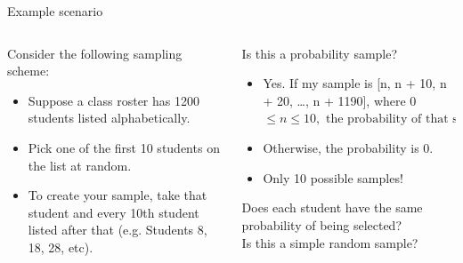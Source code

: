 \documentclass[aspectratio=169]{../latex_main/tntbeamer}  %
\begin{document}
		\begin{frame}{Example scenario}
	    \begin{columns}
	        \begin{column}{.3\textwidth}
	            Consider the following sampling scheme:

	            \begin{itemize}
	                \item Suppose a class roster has 1200 students listed alphabetically.
	                \item Pick one of the first 10 students on the list at random.
	                \item To create your sample, take that student and every 10th student listed after that (e.g. Students 8, 18, 28, etc).
	            \end{itemize}
                 
	        \end{column}
	        
	        \begin{column}{.6\textwidth}
	           Is this a probability sample?
	           \begin{itemize}
	               \item Yes. If my sample is [n, n + 10, n + 20, …, n + 1190], where 0 $\leq n \leq 10, \text{ the probability of that sample is } \frac{1}{10}$
	               \item Otherwise, the probability is 0.
	               \item Only 10 possible samples!
	           \end{itemize}
	           Does each student have the same probability of being selected?\\
	           \bigskip
	           Is this a simple random sample?


	        \end{column}
	        
	    \end{columns}
	    
	\end{frame}
	
\end{document}
